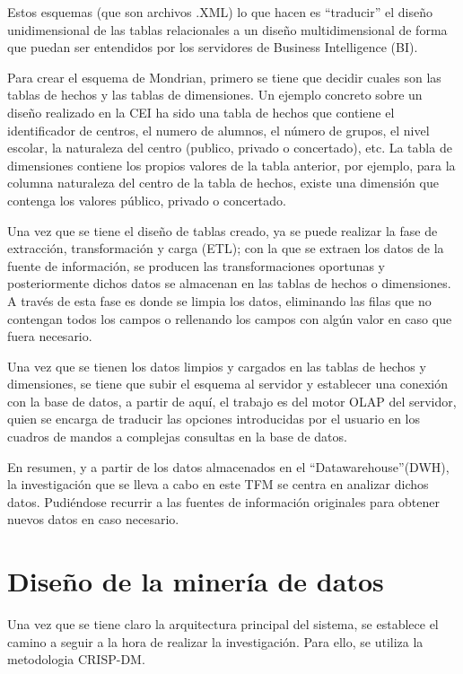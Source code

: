 Estos esquemas (que son archivos .XML) lo que hacen es ``traducir'' el diseño unidimensional de las tablas relacionales a un diseño multidimensional de forma que puedan ser entendidos por los servidores de Business Intelligence (BI). 

Para crear el esquema de Mondrian, primero se tiene que decidir cuales son las tablas de hechos y las tablas de dimensiones. Un ejemplo concreto sobre un diseño realizado en la CEI ha sido una tabla de hechos que contiene el identificador de centros, el numero de alumnos, el número de grupos, el nivel escolar, la naturaleza del centro (publico, privado o concertado), etc. La tabla de dimensiones contiene los propios valores de la tabla anterior, por ejemplo, para la columna naturaleza del centro de la tabla de hechos, existe una dimensión que contenga los valores público, privado o concertado.

Una vez que se tiene el diseño de tablas creado, ya se puede realizar la fase de extracción, transformación y carga (ETL); con la que se extraen los datos de la fuente de información, se producen las transformaciones oportunas y posteriormente dichos datos se almacenan en las tablas de hechos o dimensiones. A través de esta fase es donde se limpia los datos, eliminando las filas que no contengan todos los campos o rellenando los campos con algún valor en caso que fuera necesario.

Una vez que se tienen los datos limpios y cargados en las tablas de hechos y dimensiones, se tiene que subir el esquema al servidor y establecer una conexión con la base de datos, a partir de aquí, el trabajo es del motor OLAP del servidor, quien se encarga de traducir las opciones introducidas por el usuario en los cuadros de mandos a complejas consultas en la base de datos. 

En resumen, y a partir de los datos almacenados en el ``Datawarehouse''(DWH), la investigación que se lleva a cabo en este TFM se centra en analizar dichos datos. Pudiéndose recurrir a las fuentes de información originales para obtener nuevos datos en caso necesario. 

\section{Diseño de la minería de datos}
Una vez que se tiene claro la arquitectura principal del sistema, se establece el camino a seguir a la hora de realizar la investigación. Para ello, se utiliza la metodologia CRISP-DM. 

